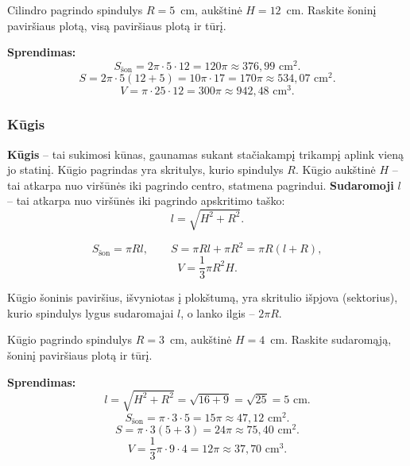 \begin{example}
Cilindro pagrindo spindulys $R = 5$~cm, aukštinė $H = 12$~cm. Raskite šoninį paviršiaus plotą, visą paviršiaus plotą ir tūrį.

\textbf{Sprendimas:}
\[
S_{\text{šon}} = 2\pi \cdot 5 \cdot 12 = 120\pi \approx 376{,}99 \text{ cm}^2.
\]
\[
S = 2\pi \cdot 5(12 + 5) = 10\pi \cdot 17 = 170\pi \approx 534{,}07 \text{ cm}^2.
\]
\[
V = \pi \cdot 25 \cdot 12 = 300\pi \approx 942{,}48 \text{ cm}^3.
\]
\end{example}

\subsubsection*{Kūgis}

\begin{definition}
\textbf{Kūgis} -- tai sukimosi kūnas, gaunamas sukant stačiakampį trikampį aplink vieną jo statinį. Kūgio pagrindas yra skritulys, kurio spindulys $R$. Kūgio aukštinė $H$ -- tai atkarpa nuo viršūnės iki pagrindo centro, statmena pagrindui. \textbf{Sudaromoji} $l$ -- tai atkarpa nuo viršūnės iki pagrindo apskritimo taško:
\[
l = \sqrt{H^2 + R^2}.
\]
\end{definition}

\begin{theorem}
\[
S_{\text{šon}} = \pi R l, \qquad S = \pi R l + \pi R^2 = \pi R(l + R),
\]
\[
V = \frac{1}{3}\pi R^2 H.
\]
\end{theorem}

\begin{remark}
Kūgio šoninis paviršius, išvyniotas į plokštumą, yra skritulio išpjova (sektorius), kurio spindulys lygus sudaromajai $l$, o lanko ilgis -- $2\pi R$.
\end{remark}

\begin{example}
Kūgio pagrindo spindulys $R = 3$~cm, aukštinė $H = 4$~cm. Raskite sudaromąją, šoninį paviršiaus plotą ir tūrį.

\textbf{Sprendimas:}
\[
l = \sqrt{H^2 + R^2} = \sqrt{16 + 9} = \sqrt{25} = 5 \text{ cm}.
\]
\[
S_{\text{šon}} = \pi \cdot 3 \cdot 5 = 15\pi \approx 47{,}12 \text{ cm}^2.
\]
\[
S = \pi \cdot 3(5 + 3) = 24\pi \approx 75{,}40 \text{ cm}^2.
\]
\[
V = \frac{1}{3}\pi \cdot 9 \cdot 4 = 12\pi \approx 37{,}70 \text{ cm}^3.
\]
\end{example}

